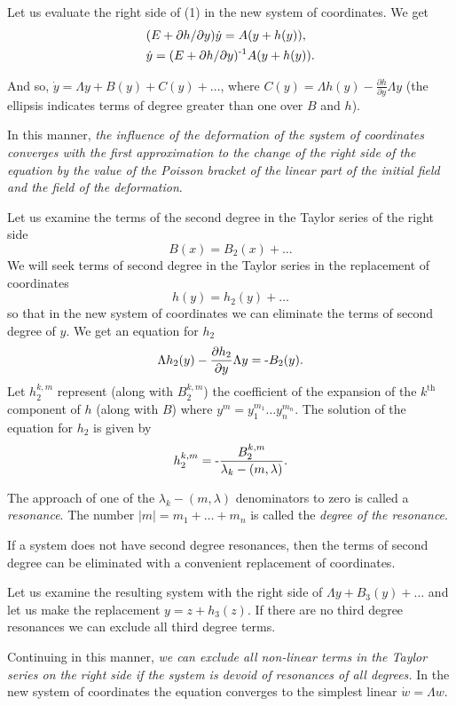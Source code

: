 \documentclass[12pt]{amsart}
\begin{document}
Let us evaluate the right side of (1) in the new system of coordinates.
We get
\begin{align*}
&(E+\partial h/\partial y)\dot y=A(y+h(y)),\\
&\dot y=(E+\partial h/\partial y)^{\text-1}A(y+h(y)).
\end{align*}

And so, $\dot y=\Lambda y+B(y)+C(y)+\dots$, where
$C(y)=\Lambda h(y)-\frac{\partial h}{\partial y}\Lambda y$ (the ellipsis
indicates terms of degree greater than one over $B$ and $h$).

In this manner, \textit{the influence of the deformation of the system of
coordinates converges with the first approximation to the change of the right
side of the equation by the value of the Poisson bracket of the linear part of
the initial field and the field of the deformation}.

Let us examine the terms of the second degree in the Taylor series of the right
side
$$B(x)=B_2(x)+\dots$$
We will seek terms of second degree in the Taylor series in the replacement of
coordinates
$$h(y)=h_2(y)+\dots$$
so that in the new system of coordinates we can eliminate the terms of second
degree of $y$.
We get an equation for $h_2$
$$\Lambda h_2(y)-\frac{\partial h_2}{\partial y}\Lambda y=\text-B_2(y).$$
Let $h_2^{k,m}$ represent (along with $B_2^{k,m}$) the coefficient of the
expansion of the $k^\text{th}$ component of $h$ (along with $B$) where
$y^m=y_1^{m_1}\dots y_n^{m_n}$.
The solution of the equation for $h_2$ is given by
$$h_2^{k,m}=\text-\frac{B_2^{k,m}}{\lambda_k-(m,\lambda)}.$$

The approach of one of the $\lambda_k-(m,\lambda)$ denominators to zero is
called a \textit{resonance}.
The number $|m|=m_1+\dots+m_n$ is called the \textit{degree of the resonance}.

If a system does not have second degree resonances, then the terms of second
degree can be eliminated with a convenient replacement of coordinates.

Let us examine the resulting system with the right side of
$\Lambda y+B_3(y)+\dots$ and let us make the replacement $y=z+h_3(z)$.
If there are no third degree resonances we can exclude all third degree terms.

Continuing in this manner, \textit{we can exclude all non-linear terms in the
Taylor series on the right side if the system is devoid of resonances of all
degrees.}
In the new system of coordinates the equation converges to the simplest linear
$\dot w=\Lambda w$.
\end{document}
